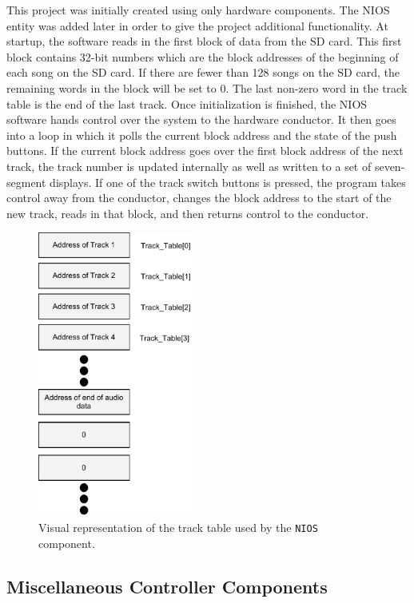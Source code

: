 \documentclass{article}
\begin{document}
This project was initially created using only hardware components. The NIOS 
entity was added later in order to give the project additional functionality. 
At startup, the software reads in the first block of data from the SD card. 
This first block contains 32-bit numbers which are the block addresses of the 
beginning of each song on the SD card. If there are fewer than 128 songs on the 
SD card, the remaining words in the block will be set to 0. The last non-zero 
word in the track table is the end of the last track. Once initialization is
finished, the NIOS software hands control over the system to the hardware
conductor. It then goes into a loop in which it polls the current block address
and the state of the push buttons. If the current block address goes over the 
first block address of the next track, the track number is updated internally
as well as written to a set of seven-segment displays. If one of the track 
switch buttons is pressed, the program takes control away from the conductor,
changes the block address to the start of the new track, reads in that block,
and then returns control to the conductor.
\begin{figure}[H]
  \centering
    \includegraphics[width=2in]{track_table_diagram}
  \caption{Visual representation of the track table used by the \texttt{NIOS} 
component.}
\end{figure}

\subsection{Miscellaneous Controller Components}
\end{document}
